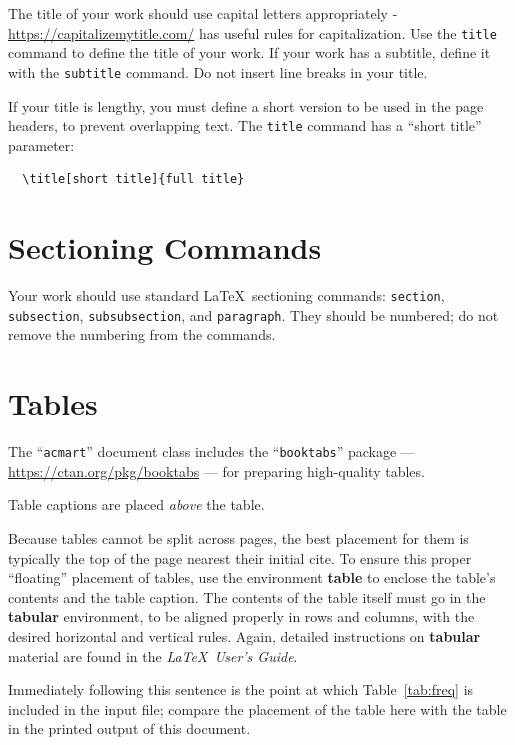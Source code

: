 \documentclass[sigconf]{acmart}
\begin{document}
	The title of your work should use capital letters appropriately -
	\url{https://capitalizemytitle.com/} has useful rules for
	capitalization. Use the {\verb|title|} command to define the title of
	your work. If your work has a subtitle, define it with the
		{\verb|subtitle|} command.  Do not insert line breaks in your title.

	If your title is lengthy, you must define a short version to be used
	in the page headers, to prevent overlapping text. The \verb|title|
	command has a ``short title'' parameter:
	\begin{verbatim}
  \title[short title]{full title}
\end{verbatim}

	\section{Sectioning Commands}

	Your work should use standard \LaTeX\ sectioning commands:
	\verb|section|, \verb|subsection|, \verb|subsubsection|, and
	\verb|paragraph|. They should be numbered; do not remove the numbering
	from the commands.

	\section{Tables}

	The ``\verb|acmart|'' document class includes the ``\verb|booktabs|''
	package --- \url{https://ctan.org/pkg/booktabs} --- for preparing
	high-quality tables.

	Table captions are placed {\itshape above} the table.

	Because tables cannot be split across pages, the best placement for
	them is typically the top of the page nearest their initial cite.  To
	ensure this proper ``floating'' placement of tables, use the
	environment \textbf{table} to enclose the table's contents and the
	table caption.  The contents of the table itself must go in the
	\textbf{tabular} environment, to be aligned properly in rows and
	columns, with the desired horizontal and vertical rules.  Again,
	detailed instructions on \textbf{tabular} material are found in the
	\textit{\LaTeX\ User's Guide}.

	Immediately following this sentence is the point at which
	Table~\ref{tab:freq} is included in the input file; compare the
	placement of the table here with the table in the printed output of
	this document.
\end{document}
